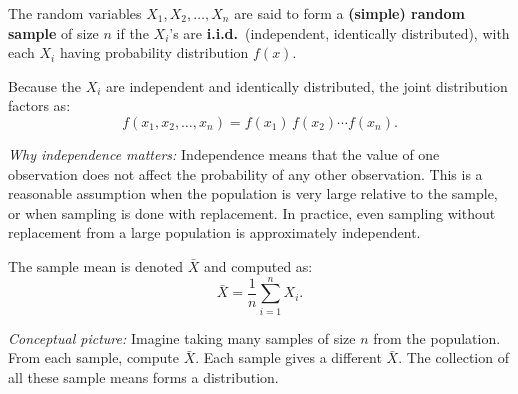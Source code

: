 \documentclass[10pt]{report}
\begin{document}
\begin{tcolorbox}[colback=softpink!15, colframe=softpink!60!black, title=Definition: Simple Random Sample]
The random variables $X_1, X_2, \ldots, X_n$ are said to form a \textbf{(simple) random sample} of size $n$ if the $X_i$'s are \textbf{i.i.d.}\ (independent, identically distributed), with each $X_i$ having probability distribution $f(x)$.
\end{tcolorbox}

Because the $X_i$ are independent and identically distributed, the joint distribution factors as:
\[
f(x_1, x_2, \ldots, x_n) = f(x_1)\,f(x_2)\cdots f(x_n).
\]

\textit{Why independence matters:} Independence means that the value of one observation does not affect the probability of any other observation. This is a reasonable assumption when the population is very large relative to the sample, or when sampling is done with replacement. In practice, even sampling without replacement from a large population is approximately independent.

\medskip

The sample mean is denoted $\bar{X}$ and computed as:
\[
\bar{X} = \frac{1}{n}\sum_{i=1}^n X_i.
\]

\textit{Conceptual picture:} Imagine taking many samples of size $n$ from the population. From each sample, compute $\bar{X}$. Each sample gives a different $\bar{X}$. The collection of all these sample means forms a distribution.

\begin{center}
\end{center}
\end{document}
